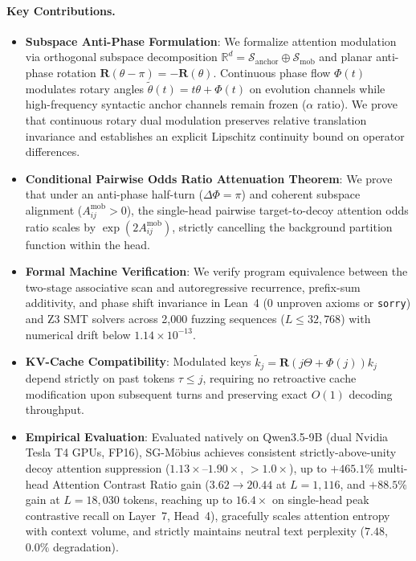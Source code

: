 \documentclass[11pt,a4paper]{article}
\theoremstyle{definition}
\begin{document}
\paragraph{Key Contributions.}
\begin{itemize}
    \item \textbf{Subspace Anti-Phase Formulation}: We formalize attention modulation via orthogonal subspace decomposition $\mathbb{R}^d = \mathcal{S}_{\text{anchor}} \oplus \mathcal{S}_{\text{mob}}$ and planar anti-phase rotation $\mathbf{R}(\theta - \pi) = -\mathbf{R}(\theta)$. Continuous phase flow $\Phi(t)$ modulates rotary angles $\tilde{\theta}(t) = t\theta + \Phi(t)$ on evolution channels while high-frequency syntactic anchor channels remain frozen ($\alpha$ ratio). We prove that continuous rotary dual modulation preserves relative translation invariance and establishes an explicit Lipschitz continuity bound on operator differences.
    \item \textbf{Conditional Pairwise Odds Ratio Attenuation Theorem}: We prove that under an anti-phase half-turn ($\Delta \Phi = \pi$) and coherent subspace alignment ($A_{ij}^{\text{mob}} > 0$), the single-head pairwise target-to-decoy attention odds ratio scales by $\exp(2 A_{ij}^{\text{mob}})$, strictly cancelling the background partition function within the head.
    \item \textbf{Formal Machine Verification}: We verify program equivalence between the two-stage associative scan and autoregressive recurrence, prefix-sum additivity, and phase shift invariance in Lean~4 (0 unproven axioms or \texttt{sorry}) and Z3 SMT solvers across 2,000 fuzzing sequences ($L \le 32,768$) with numerical drift below $1.14 \times 10^{-13}$.
    \item \textbf{KV-Cache Compatibility}: Modulated keys $\tilde{k}_j = \mathbf{R}(j\Theta + \Phi(j)) k_j$ depend strictly on past tokens $\tau \le j$, requiring no retroactive cache modification upon subsequent turns and preserving exact $O(1)$ decoding throughput.
    \item \textbf{Empirical Evaluation}: Evaluated natively on Qwen3.5-9B (dual Nvidia Tesla T4 GPUs, FP16), SG-M\"obius achieves consistent strictly-above-unity decoy attention suppression ($1.13\times\text{--}1.90\times$, $> 1.0\times$), up to $+465.1\%$ multi-head Attention Contrast Ratio gain ($3.62 \to 20.44$ at $L=1,116$, and $+88.5\%$ gain at $L=18,030$ tokens, reaching up to $16.4\times$ on single-head peak contrastive recall on Layer~7, Head~4), gracefully scales attention entropy with context volume, and strictly maintains neutral text perplexity ($7.48$, $0.0\%$ degradation).
\end{itemize}
\end{document}
